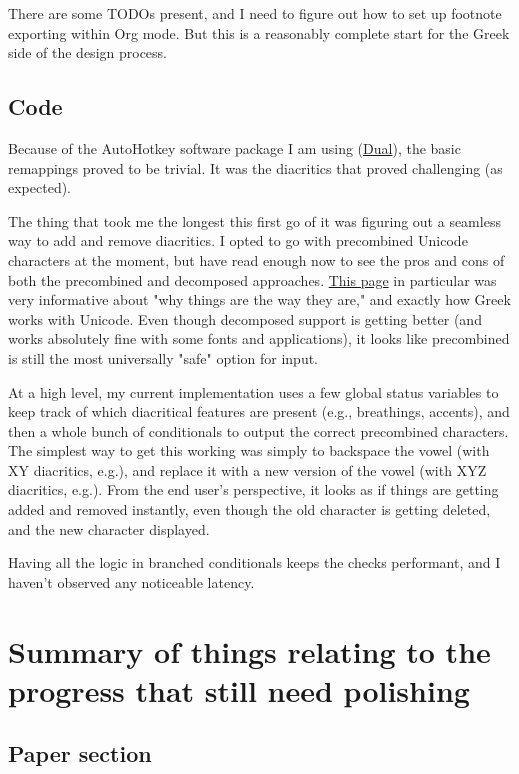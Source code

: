 \documentclass[11pt]{article}
\begin{document}
There are some TODOs present, and I need to figure out how to set up footnote exporting within Org mode. But this is a reasonably complete start for the Greek side of the design process.

\subsection{Code}
\label{sec:org828acf6}

Because of the AutoHotkey software package I am using (\href{https://github.com/lydell/dual}{Dual}), the basic remappings proved to be trivial. It was the diacritics that proved challenging (as expected).

The thing that took me the longest this first go of it was figuring out a seamless way to add and remove diacritics. I opted to go with precombined Unicode characters at the moment, but have read enough now to see the pros and cons of both the precombined and decomposed approaches. \href{http://www.opoudjis.net/unicode/unicode.html}{This page} in particular was very informative about "why things are the way they are," and exactly how Greek works with Unicode. Even though decomposed support is getting better (and works absolutely fine with some fonts and applications), it looks like precombined is still the most universally "safe" option for input.

At a high level, my current implementation uses a few global status variables to keep track of which diacritical features are present (e.g., breathings, accents), and then a whole bunch of conditionals to output the correct precombined characters. The simplest way to get this working was simply to backspace the vowel (with XY diacritics, e.g.), and replace it with a new version of the vowel (with XYZ diacritics, e.g.). From the end user's perspective, it looks as if things are getting added and removed instantly, even though the old character is getting deleted, and the new character displayed.

Having all the logic in branched conditionals keeps the checks performant, and I haven't observed any noticeable latency.

\section{Summary of things relating to the progress that still need polishing}
\label{sec:org1919f97}

\subsection{Paper section}
\label{sec:org930f90d}
\end{document}

